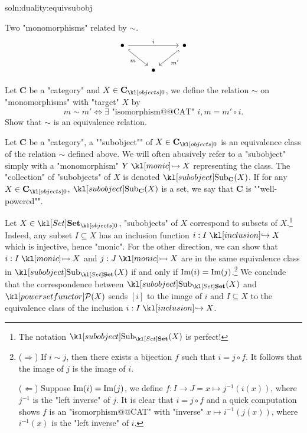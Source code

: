 \documentclass[main.tex]{subfiles}
\begin{document}
\begin{exer}{soln:duality:equivsubobj}\label{exer:duality:equivsubobj}
	\begin{marginfigure}[1\baselineskip]
		Two "monomorphisms" related by $\sim$.
		\begin{equation*}
			\begin{tikzcd}
				\bullet && \bullet \\
				& \bullet
				\arrow["m"', hook, from=1-1, to=2-2]
				\arrow["{m'}", hook, from=1-3, to=2-2]
				\arrow["i", from=1-1, to=1-3]
			\end{tikzcd}
		\end{equation*}
	\end{marginfigure}
	Let $\mathbf{C}$ be a "category" and $X \in \obj{\mathbf{C}}$, we define the relation $\sim$ on "monomorphisms" with "target" $X$ by \[m \sim m' \Leftrightarrow \exists \text{ "isomorphism@@CAT" } i,  m = m' \circ i.\]
	Show that $\sim$ is an equivalence relation.
\end{exer}
\begin{defn}[Subobject]
	\AP Let $\mathbf{C}$ be a "category", a ""subobject"" of $X \in \obj{\mathbf{C}}$ is an equivalence class of the relation $\sim$ defined above. We will often abusively refer to a "subobject" simply with a "monomorphism" $Y \mono X$ representing the class. The "collection" of "subobjects" of $X$ is denoted $\Sub_{\mathbf{C}}(X)$. \AP If for any $X \in \obj{\mathbf{C}}$, $\Sub_{\mathbf{C}}(X)$ is a set, we say that $\mathbf{C}$ is ""well-powered"".
\end{defn}
\begin{exmp}[$\catSet$]\label{exmp:subobjsubset}
	Let $X \in \obj{\catSet}$, "subobjects" of $X$ correspond to subsets of $X$.\footnote{The notation $\Sub_{\catSet}(X)$ is perfect!} Indeed, any subset $I \subseteq X$ has an inclusion function $i: I \inclusion X$ which is injective, hence "monic". For the other direction, we can show that $i:I \mono X$ and $j: J \mono X$ are in the same equivalence class in $\Sub_{\catSet}(X)$ if and only if $\operatorname{Im}(i) = \operatorname{Im}(j)$.\footnote{($\Rightarrow$) If $i \sim j$, then there exists a bijection $f$ such that $i = j \circ f$. It follows that the image of $j$ is the image of $i$.
	
	($\Leftarrow$) Suppose $\operatorname{Im}(i)=\operatorname{Im}(j)$, we define $f:I \rightarrow J = x \mapsto j^{-1}(i(x))$, where $j^{-1}$ is the "left inverse" of $j$. It is clear that $i = j \circ f$ and a quick computation shows $f$ is an "isomorphism@@CAT" with "inverse" $x\mapsto i^{-1}(j(x))$, where $i^{-1}(x)$ is the "left inverse" of $i$.} We conclude that the correspondence between $\Sub_{\catSet}(X)$ and $\mPcov(X)$ sends $[i]$ to the image of $i$ and $I\subseteq X$ to the equivalence class of the inclusion $i: I \inclusion X$.
\end{exmp}
\end{document}
